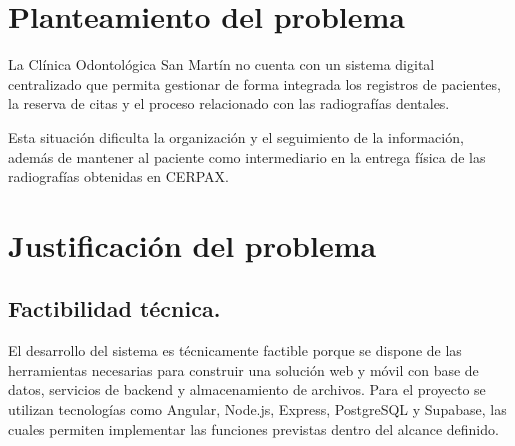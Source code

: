 			
			
			
		
		
	
	
	
	
	
\section{Planteamiento del problema}

La Clínica Odontológica San Martín no cuenta con un sistema digital
centralizado que permita gestionar de forma integrada los registros de
pacientes, la reserva de citas y el proceso relacionado con las radiografías
dentales.

Esta situación dificulta la organización y el seguimiento de la información,
además de mantener al paciente como intermediario en la entrega física de
las radiografías obtenidas en CERPAX.
	
	
	
	\section{Justificación del problema}
	
	\subsection{Factibilidad técnica.}
	
	El desarrollo del sistema es técnicamente factible porque se dispone de
	las herramientas necesarias para construir una solución web y móvil con
	base de datos, servicios de backend y almacenamiento de archivos. Para el
	proyecto se utilizan tecnologías como Angular, Node.js, Express,
	PostgreSQL y Supabase, las cuales permiten implementar las funciones
	previstas dentro del alcance definido.
	
